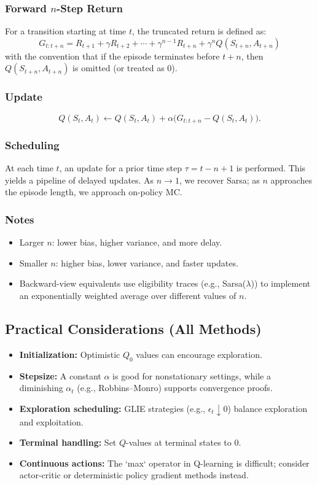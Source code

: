 \documentclass[12pt]{article}
\begin{document}
\subsubsection*{Forward $n$-Step Return}
For a transition starting at time $t$, the truncated return is defined as:
$$
G_{t:t+n} = R_{t+1} + \gamma R_{t+2} + \cdots + \gamma^{n-1} R_{t+n} + \gamma^n Q(S_{t+n}, A_{t+n})
$$
with the convention that if the episode terminates before $t+n$, then $Q(S_{t+n},A_{t+n})$ is omitted (or treated as $0$).

\subsubsection*{Update}
$$
Q(S_t, A_t) \leftarrow Q(S_t, A_t) + \alpha \bigl(G_{t:t+n} - Q(S_t, A_t)\bigr).
$$

\subsubsection*{Scheduling}
At each time $t$, an update for a prior time step $\tau = t - n + 1$ is performed. This yields a pipeline of delayed updates. As $n \to 1$, we recover Sarsa; as $n$ approaches the episode length, we approach on-policy MC.

\subsubsection*{Notes}
\begin{itemize}
    \item Larger $n$: lower bias, higher variance, and more delay.
    \item Smaller $n$: higher bias, lower variance, and faster updates.
    \item Backward-view equivalents use eligibility traces (e.g., Sarsa($\lambda$)) to implement an exponentially weighted average over different values of $n$.
\end{itemize}

\subsection{Practical Considerations (All Methods)}
\begin{itemize}
    \item \textbf{Initialization:} Optimistic $Q_0$ values can encourage exploration.
    \item \textbf{Stepsize:} A constant $\alpha$ is good for nonstationary settings, while a diminishing $\alpha_t$ (e.g., Robbins--Monro) supports convergence proofs.
    \item \textbf{Exploration scheduling:} GLIE strategies (e.g., $\epsilon_t \downarrow 0$) balance exploration and exploitation.
    \item \textbf{Terminal handling:} Set $Q$-values at terminal states to $0$.
    \item \textbf{Continuous actions:} The `max` operator in Q-learning is difficult; consider actor-critic or deterministic policy gradient methods instead.
\end{itemize}
\end{document}
